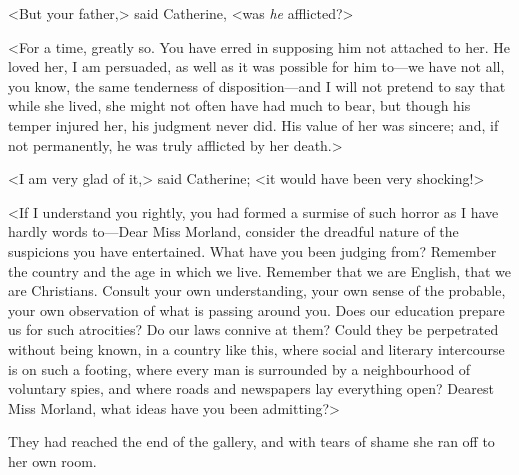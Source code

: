  <But your father,> said Catherine, <was \textit{he} afflicted?> 

 <For a time, greatly so. You have erred in supposing him not attached to her. He loved her, I am persuaded, as well as it was possible for him to—we have not all, you know, the same tenderness of disposition—and I will not pretend to say that while she lived, she might not often have had much to bear, but though his temper injured her, his judgment never did. His value of her was sincere; and, if not permanently, he was truly afflicted by her death.> 

 <I am very glad of it,> said Catherine; <it would have been very shocking!> 

 <If I understand you rightly, you had formed a surmise of such horror as I have hardly words to—Dear Miss Morland, consider the dreadful nature of the suspicions you have entertained. What have you been judging from? Remember the country and the age in which we live. Remember that we are English, that we are Christians. Consult your own understanding, your own sense of the probable, your own observation of what is passing around you. Does our education prepare us for such atrocities? Do our laws connive at them? Could they be perpetrated without being known, in a country like this, where social and literary intercourse is on such a footing, where every man is surrounded by a neighbourhood of voluntary spies, and where roads and newspapers lay everything open? Dearest Miss Morland, what ideas have you been admitting?> 

 They had reached the end of the gallery, and with tears of shame she ran off to her own room. 